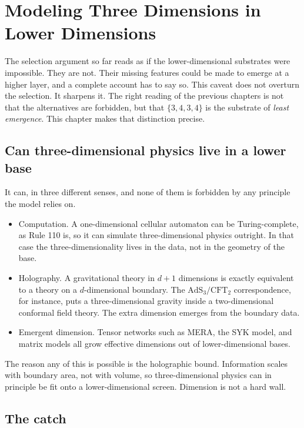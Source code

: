\section{Modeling Three Dimensions in Lower Dimensions}

The selection argument so far reads as if the lower-dimensional substrates were impossible. They are not. Their
missing features could be made to emerge at a higher layer, and a complete account has to say so. This caveat does
not overturn the selection. It sharpens it. The right reading of the previous chapters is not that the
alternatives are forbidden, but that $\{3,4,3,4\}$ is the substrate of \emph{least emergence}. This chapter makes
that distinction precise.

\subsection{Can three-dimensional physics live in a lower base}

It can, in three different senses, and none of them is forbidden by any principle the model relies on.

\begin{itemize}
  \item Computation. A one-dimensional cellular automaton can be Turing-complete, as Rule 110 is, so it can
  simulate three-dimensional physics outright. In that case the three-dimensionality lives in the data, not in the
  geometry of the base.
  \item Holography. A gravitational theory in $d+1$ dimensions is exactly equivalent to a theory on a
  $d$-dimensional boundary. The $\mathrm{AdS}_3/\mathrm{CFT}_2$ correspondence, for instance, puts a
  three-dimensional gravity inside a two-dimensional conformal field theory. The extra dimension emerges from the
  boundary data.
  \item Emergent dimension. Tensor networks such as MERA, the SYK model, and matrix models all grow effective
  dimensions out of lower-dimensional bases.
\end{itemize}

The reason any of this is possible is the holographic bound. Information scales with boundary area, not with
volume, so three-dimensional physics can in principle be fit onto a lower-dimensional screen. Dimension is not a
hard wall.

\subsection{The catch}

